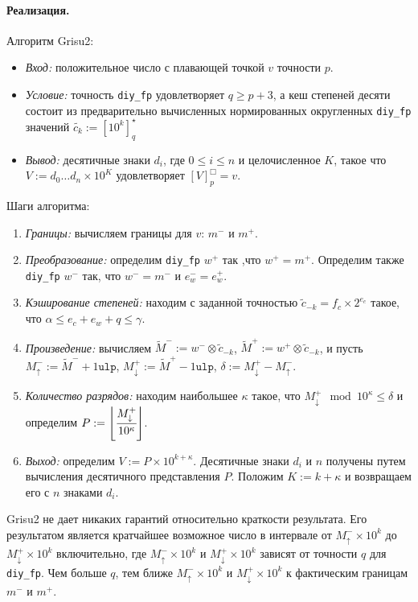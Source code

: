 \documentclass[a4paper, 12pt, twoside]{article}
\begin{document}
\paragraph{Реализация.}
Алгоритм \textsf{Grisu2}: \begin{itemize}
\item \textit{Вход:} положительное число с плавающей точкой $v$ точности $p$.
\item \textit{Условие:} точность \texttt{diy\_fp} удовлетворяет $q \geqslant p + 3$, а кеш степеней десяти состоит из предварительно вычисленных нормированных округленных  \texttt{diy\_fp} значений $\tilde{c_k} := \left[ 10^k \right]_q^{\star}$
\item \textit{Вывод:} десятичные знаки $d_i$, где $0 \leqslant i \leqslant n$ и целочисленное $K$, такое что $V:=d_0\dots d_n \times 10 ^K$ удовлетворяет $[V]^{\Box}_p = v$. 
\end{itemize}

Шаги алгоритма:
\begin{enumerate}
\item \textit{Границы:} вычисляем границы для $v$: $m^{-}$ и $m^{+}$. 
\item \textit{Преобразование:} определим \texttt{diy\_fp} $w^+$ так ,что $w^+ = m^+$. 
Определим также \texttt{diy\_fp} $w^-$ так, что $w^{-} = m^-$ и $e_w^- = e_w^+$.
\item \textit{Кэширование степеней:} находим с заданной точностью $\tilde{c}_{-k} = f_c \times 2^{e_c}$ такое, что $\alpha \leqslant e_c + e_w + q \leqslant \gamma$.
\item \textit{Произведение:} вычисляем $\tilde{M}^- := w^- \otimes \tilde{c}_{-k}$, $\tilde{M}^+ := w^+ \otimes \tilde{c}_{-k}$, и пусть $M_\uparrow^- := \tilde{M}^- + 1 \texttt{ulp}$, $M_\downarrow^+ := \tilde{M}^+ - 1 \texttt{ulp}$, $\delta := M_\downarrow^+ - M_\uparrow^-$.
\item \textit{Количество разрядов:} находим наибольшее $\kappa$ такое, что $M_\downarrow^+ \mod 10^\kappa \leqslant \delta$ и определим $P:= \left\lfloor \cfrac{M_\downarrow^+}{10^\kappa} \right\rfloor$.
\item \textit{Выход:} определим $V:= P \times 10^{k + \kappa}$. 
Десятичные знаки $d_i$ и $n$ получены путем вычисления десятичного представления $P$.
Положим $K:=k+\kappa$ и возвращаем его с $n$ знаками $d_i$.
\end{enumerate}

\textsf{Grisu2} не дает никаких гарантий относительно краткости результата. 
Его результатом является кратчайшее возможное число в интервале от $M_\uparrow^- \times 10^k$ до $M_\downarrow^+ \times 10^k$ включительно, где $M_\uparrow^- \times 10^k$ и $M_\downarrow^+ \times 10^k$  зависят от точности $q$ для \texttt{diy\_fp}.
Чем больше $q$, тем ближе $M_\uparrow^- \times 10^k$ и $M_\downarrow^+ \times 10^k$ к фактическим границам $m^-$ и $m^+$. 
\end{document}
